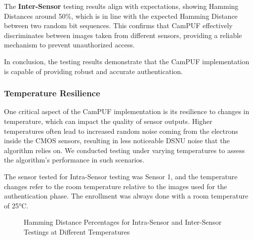 The \textbf{Inter-Sensor} testing results align with expectations, showing Hamming Distances around 50\%, which is in line with the expected Hamming Distance between two random bit sequences. This confirms that CamPUF effectively discriminates between images taken from different sensors, providing a reliable mechanism to prevent unauthorized access.

In conclusion, the testing results demonstrate that the CamPUF implementation is capable of providing robust and accurate authentication.

\subsubsection{Temperature Resilience}\label{sec:temperature}

One critical aspect of the CamPUF implementation is its resilience to changes in temperature, which can impact the quality of sensor outputs. Higher temperatures often lead to increased random noise coming from the electrons inside the CMOS sensors, resulting in less noticeable DSNU noise that the algorithm relies on. We conducted testing under varying temperatures to assess the algorithm's performance in such scenarios.

The sensor tested for Intra-Sensor testing was Sensor 1, and the temperature changes refer to the room temperature relative to the images used for the authentication phase. The enrollment was always done with a room temperature of 25°C.

\begin{figure}[h!]
	\centering
	\caption{Hamming Distance Percentages for Intra-Sensor and Inter-Sensor Testings at Different Temperatures}
	\label{fig:temperature_graph}
\end{figure}


